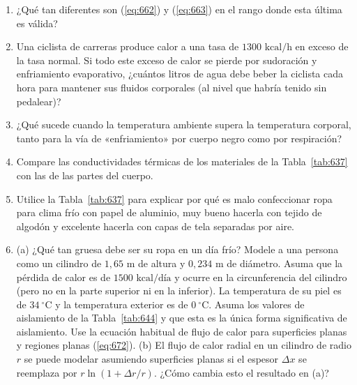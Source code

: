 \documentclass[12pt]{book}
\begin{document}
\begin{enumerate}
\item[6.99] ¿Qué tan diferentes son (\ref{eq:662}) y (\ref{eq:663}) en el rango donde esta última es válida?

\item[6.100] Una ciclista de carreras produce calor a una tasa de $1300\text{ kcal/h}$ en exceso de la tasa normal. Si todo este exceso de calor se pierde por sudoración y enfriamiento evaporativo, ¿cuántos litros de agua debe beber la ciclista cada hora para mantener sus fluidos corporales (al nivel que habría tenido sin pedalear)?

\item[6.101] ¿Qué sucede cuando la temperatura ambiente supera la temperatura corporal, tanto para la vía de «enfriamiento» por cuerpo negro como por respiración?

\item[6.102] Compare las conductividades térmicas de los materiales de la Tabla~\ref{tab:637} con las de las partes del cuerpo.

\item[6.103] Utilice la Tabla~\ref{tab:637} para explicar por qué es malo confeccionar ropa para clima frío con papel de aluminio, muy bueno hacerla con tejido de algodón y excelente hacerla con capas de tela separadas por aire.

\item[6.104] (a) ¿Qué tan gruesa debe ser su ropa en un día frío? Modele a una persona como un cilindro de $1{,}65\text{ m}$ de altura y $0{,}234\text{ m}$ de diámetro. Asuma que la pérdida de calor es de $1500\text{ kcal/día}$ y ocurre en la circunferencia del cilindro (pero no en la parte superior ni en la inferior). La temperatura de su piel es de $34\ ^\circ\text{C}$ y la temperatura exterior es de $0\ ^\circ\text{C}$. Asuma los valores de aislamiento de la Tabla~\ref{tab:644} y que esta es la única forma significativa de aislamiento. Use la ecuación habitual de flujo de calor para superficies planas y regiones planas (\ref{eq:672}). (b) El flujo de calor radial en un cilindro de radio $r$ se puede modelar asumiendo superficies planas si el espesor $\Delta x$ se reemplaza por $r \ln(1 + \Delta r/r)$. ¿Cómo cambia esto el resultado en (a)?


\end{enumerate}
\end{document}
